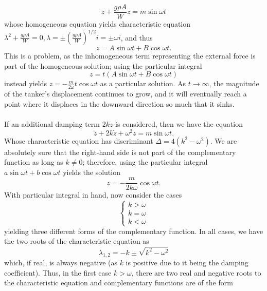 \documentclass{article}
\begin{document}
\begin{equation*}
    \ddot{z} + \frac{g\rho A }{W} z = m\sin \omega t
\end{equation*}
whose homogeneous equation yields characteristic equation $\lambda^2 + \frac{g\rho A}{W} = 0, \lambda = \pm (\frac{g\rho A}{W})^{1/2} i = \pm \omega i$, and thus 
\begin{equation*}
    z = A\sin \omega t + B \cos \omega t.
\end{equation*}
This is a problem, as the inhomogeneous term representing the external force is part of the homogeneous solution; using the particular integral
\begin{equation*}
    z = t(A\sin \omega t + B \cos \omega t)
\end{equation*}
instead yields $z = -\frac{m}{2\omega} t \cos \omega t$ as a particular solution. As $t\to\infty$, the magnitude of the tanker's displacement continues to grow, and it will eventually reach a point where it displaces in the downward direction so much that it sinks. \\ \\
If an additional damping term $2k\dot{z}$ is considered, then we have the equation
\begin{equation*}
    \ddot{z} + 2k\dot{z} + \omega^2 z = m \sin \omega t.
\end{equation*}
Whose characteristic equation has discriminant $\Delta = 4(k^2-\omega^2)$. We are absolutely sure that the right-hand side is not part of the complementary function as long as $k \neq 0$; therefore, using the particular integral $a \sin \omega t + b \cos \omega t$ yields the solution
\begin{equation*}
    z = -\frac{m}{2k\omega}\cos \omega t.
\end{equation*} With particular integral in hand, now consider the cases 
\begin{equation*}
\begin{cases}
    k > \omega \\
    k= \omega \\
    k < \omega
\end{cases}
\end{equation*} 
yielding three different forms of the complementary function. In all cases, we have the two roots of the characteristic equation as 
\begin{equation*}
    \lambda_{1, 2} = -k \pm \sqrt{k^2 - \omega^2}
\end{equation*}
which, if real, is always negative (as $k$ is positive due to it being the damping coefficient). Thus, in the first case $k > \omega$, there are two real and negative roots to the characteristic equation and complementary functions are of the form
\end{document}
